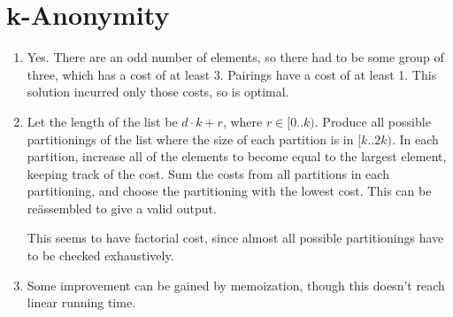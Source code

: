 \documentclass[11pt]{article}
\begin{document}
\section{k-Anonymity}
\begin{enumerate}
\item Yes. There are an odd number of elements, so there had to be some group of three, which has a cost of at least 3. Pairings have a cost of at least 1. This solution incurred only those costs, so is optimal.
\item Let the length of the list be \(d\cdot k+r\), where \(r\in[0..k)\). Produce all possible partitionings of the list where the size of each partition is in \([k..2k)\). In each partition, increase all of the elements to become equal to the largest element, keeping track of the cost. Sum the costs from all partitions in each partitioning, and choose the partitioning with the lowest cost. This can be re\"assembled to give a valid output.

  This seems to have factorial cost, since almost all possible partitionings have to be checked exhaustively.
\item Some improvement can be gained by memoization, though this doesn't reach linear running time.
\end{enumerate}
\end{document}
